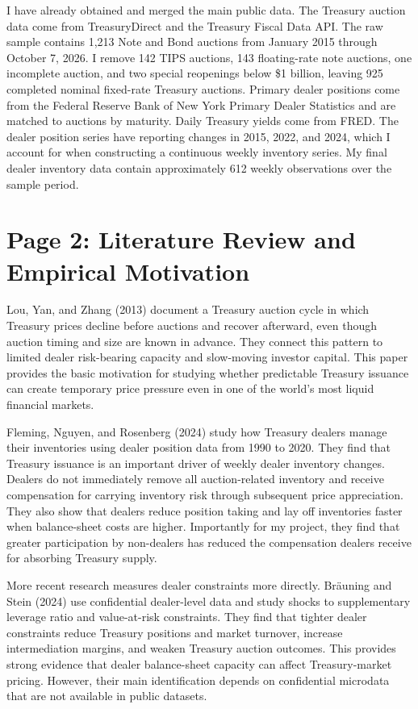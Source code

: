 \documentclass[12pt]{article}
\begin{document}
I have already obtained and merged the main public data. The Treasury auction data come from TreasuryDirect and the Treasury Fiscal Data API. The raw sample contains 1,213 Note and Bond auctions from January 2015 through October 7, 2026. I remove 142 TIPS auctions, 143 floating-rate note auctions, one incomplete auction, and two special reopenings below \$1 billion, leaving 925 completed nominal fixed-rate Treasury auctions. Primary dealer positions come from the Federal Reserve Bank of New York Primary Dealer Statistics and are matched to auctions by maturity. Daily Treasury yields come from FRED. The dealer position series have reporting changes in 2015, 2022, and 2024, which I account for when constructing a continuous weekly inventory series. My final dealer inventory data contain approximately 612 weekly observations over the sample period.

\newpage
\section{Page 2: Literature Review and Empirical Motivation}

Lou, Yan, and Zhang (2013) document a Treasury auction cycle in which Treasury prices decline before auctions and recover afterward, even though auction timing and size are known in advance. They connect this pattern to limited dealer risk-bearing capacity and slow-moving investor capital. This paper provides the basic motivation for studying whether predictable Treasury issuance can create temporary price pressure even in one of the world's most liquid financial markets.

Fleming, Nguyen, and Rosenberg (2024) study how Treasury dealers manage their inventories using dealer position data from 1990 to 2020. They find that Treasury issuance is an important driver of weekly dealer inventory changes. Dealers do not immediately remove all auction-related inventory and receive compensation for carrying inventory risk through subsequent price appreciation. They also show that dealers reduce position taking and lay off inventories faster when balance-sheet costs are higher. Importantly for my project, they find that greater participation by non-dealers has reduced the compensation dealers receive for absorbing Treasury supply.

More recent research measures dealer constraints more directly. Br\"auning and Stein (2024) use confidential dealer-level data and study shocks to supplementary leverage ratio and value-at-risk constraints. They find that tighter dealer constraints reduce Treasury positions and market turnover, increase intermediation margins, and weaken Treasury auction outcomes. This provides strong evidence that dealer balance-sheet capacity can affect Treasury-market pricing. However, their main identification depends on confidential microdata that are not available in public datasets.
\end{document}
